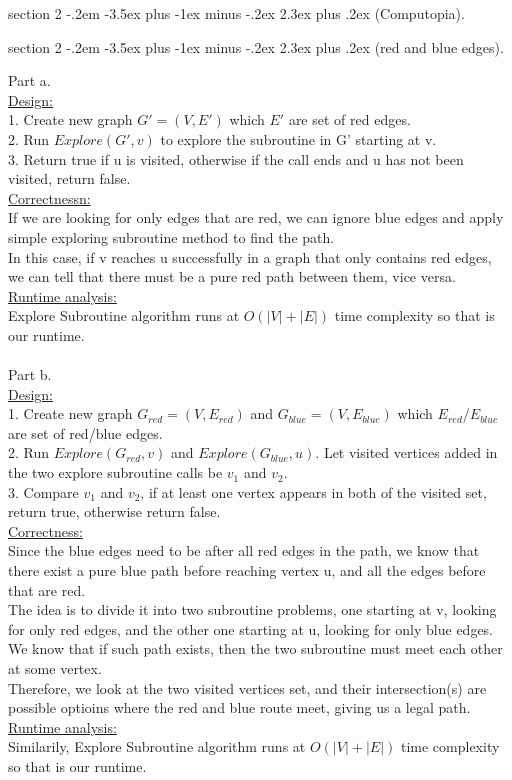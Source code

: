 \documentclass{article}
\makeatletter
\newenvironment{problem}{\@startsection
       {section}
       {2}
       {-.2em}
       {-3.5ex plus -1ex minus -.2ex}
       {2.3ex plus .2ex}
       {\pagebreak[3]%
       \large\bf\noindent{Problem }
       }
       }
\makeatother
\begin{document}
\begin{problem}{(Computopia).}
\end{problem}


\newpage

\begin{problem}{(red and blue edges).}

Part a.\\
\underline{Design:}\\
1. Create new graph \(G'=(V, E')\) which \(E'\) are set of red edges.\\
2. Run \(Explore(G', v)\) to explore the subroutine in G' starting at v.\\
3. Return true if u is visited, otherwise if the call ends and u has not been visited, return false.\\
\underline{Correctnessn:}\\
If we are looking for only edges that are red, we can ignore blue edges and apply simple exploring subroutine method to find the path.\\
In this case, if v reaches u successfully in a graph that only contains red edges, we can tell that there must be a pure red path between them, vice versa.\\
\underline{Runtime analysis:}\\
Explore Subroutine algorithm runs at \(O(|V|+|E|)\) time complexity so that is our runtime.
\\ \hspace*{\fill} \\
Part b.\\
\underline{Design:}\\
1. Create new graph \(G_{red}=(V, E_{red})\) and \(G_{blue}=(V, E_{blue})\) which \(E_{red}\)/\(E_{blue}\) are set of red/blue edges.\\
2. Run \(Explore(G_{red}, v)\) and \(Explore(G_{blue}, u)\). Let visited vertices added in the two explore subroutine calls be \(v_1\) and \(v_2\).\\
3. Compare \(v_1\) and \(v_2\), if at least one vertex appears in both of the visited set, return true, otherwise return false.\\
\underline{Correctness:}\\
Since the blue edges need to be after all red edges in the path, we know that there exist a pure blue path before reaching vertex u, and all the edges before that are red.\\
The idea is to divide it into two subroutine problems, one starting at v, looking for only red edges, and the other one starting at u, looking for only blue edges.\\
We know that if such path exists, then the two subroutine must meet each other at some vertex.\\
Therefore, we look at the two visited vertices set, and their intersection(s) are possible optioins where the red and blue route meet, giving us a legal path.\\
\underline{Runtime analysis:}\\
Similarily, Explore Subroutine algorithm runs at \(O(|V|+|E|)\) time complexity so that is our runtime.


\end{problem}
\end{document}
